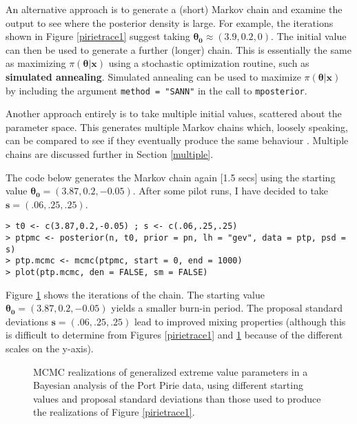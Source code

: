 \documentclass[11pt,a4paper]{article}
\newcommand{\bs}{\boldsymbol}
\begin{document}
An alternative approach is to generate a (short) Markov chain and
examine the output to see where the posterior density is large.  For
example, the iterations shown in Figure \ref{pirietrace1} suggest
taking $\bs{\theta_0} \approx (3.9,0.2,0)$.  The initial value can
then be used to generate a further (longer) chain.  This is
essentially the same as maximizing $\pi(\bs{\theta}|\bs{x})$ using a
stochastic optimization routine, such as \textbf{simulated annealing}.
Simulated annealing can be used to maximize $\pi(\bs{\theta}|\bs{x})$
by including the argument \verb+method = "SANN"+ in the call to
\verb+mposterior+.

Another approach entirely is to take multiple initial values,
scattered about the parameter space.  This generates multiple Markov
chains which, loosely speaking, can be compared to see if they
eventually produce the same behaviour \citep{gelmrubi92}.  Multiple
chains are discussed further in Section \ref{multiple}.

The code below generates the Markov chain again [1.5 secs] using the
starting value $\bs{\theta_0} = (3.87,0.2,-0.05)$.  After some pilot
runs, I have decided to take $\bs{s} = (.06,.25,.25)$.

\begin{verbatim}
> t0 <- c(3.87,0.2,-0.05) ; s <- c(.06,.25,.25)
> ptpmc <- posterior(n, t0, prior = pn, lh = "gev", data = ptp, psd = s)
> ptp.mcmc <- mcmc(ptpmc, start = 0, end = 1000)
> plot(ptp.mcmc, den = FALSE, sm = FALSE)
\end{verbatim}

Figure \ref{pirietrace2} shows the iterations of the chain.  The
starting value $\bs{\theta_0} = (3.87,0.2,-0.05)$ yields a smaller
burn-in period.  The proposal standard deviations $\bs{s} =
(.06,.25,.25)$ lead to improved mixing properties (although this is
difficult to determine from Figures \ref{pirietrace1} and
\ref{pirietrace2} because of the different scales on the y-axis).

\begin{figure}
\begin{center}
   \vspace{-1.5cm}
  \hspace{0cm} 
  \hspace{0cm} 
\end{center}
\caption{MCMC realizations of generalized extreme value parameters in
  a Bayesian analysis of the Port Pirie data, using different starting
  values and proposal standard deviations than those used to produce
  the realizations of Figure \ref{pirietrace1}.}
\label{pirietrace2}
\end{figure}
\end{document}
